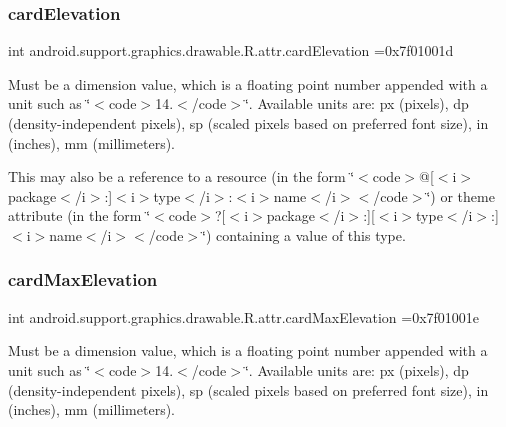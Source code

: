 \subsubsection{\texorpdfstring{card\+Elevation}{cardElevation}}
{\footnotesize\ttfamily int android.\+support.\+graphics.\+drawable.\+R.\+attr.\+card\+Elevation =0x7f01001d\hspace{0.3cm}{\ttfamily [static]}}

Must be a dimension value, which is a floating point number appended with a unit such as \char`\"{}$<$code$>$14.\+5sp$<$/code$>$\char`\"{}. Available units are\+: px (pixels), dp (density-\/independent pixels), sp (scaled pixels based on preferred font size), in (inches), mm (millimeters). 

This may also be a reference to a resource (in the form \char`\"{}$<$code$>$@\mbox{[}$<$i$>$package$<$/i$>$\+:\mbox{]}$<$i$>$type$<$/i$>$\+:$<$i$>$name$<$/i$>$$<$/code$>$\char`\"{}) or theme attribute (in the form \char`\"{}$<$code$>$?\mbox{[}$<$i$>$package$<$/i$>$\+:\mbox{]}\mbox{[}$<$i$>$type$<$/i$>$\+:\mbox{]}$<$i$>$name$<$/i$>$$<$/code$>$\char`\"{}) containing a value of this type. \mbox{\label{classandroid_1_1support_1_1graphics_1_1drawable_1_1R_1_1attr_a20a27799ec95b449d68f639c8fc0b0d4}} 
\subsubsection{\texorpdfstring{card\+Max\+Elevation}{cardMaxElevation}}
{\footnotesize\ttfamily int android.\+support.\+graphics.\+drawable.\+R.\+attr.\+card\+Max\+Elevation =0x7f01001e\hspace{0.3cm}{\ttfamily [static]}}

Must be a dimension value, which is a floating point number appended with a unit such as \char`\"{}$<$code$>$14.\+5sp$<$/code$>$\char`\"{}. Available units are\+: px (pixels), dp (density-\/independent pixels), sp (scaled pixels based on preferred font size), in (inches), mm (millimeters). 

